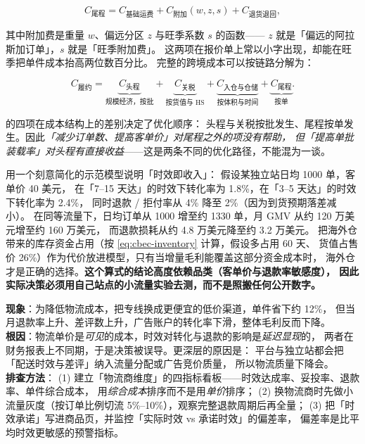 \begin{equation}
C_{\text{尾程}} = C_{\text{基础运费}} + C_{\text{附加}}(w, z, s) + C_{\text{退货退回}} ,
\label{eq:cbec-leg3}
\end{equation}

其中附加费是重量 $w$、偏远分区 $z$ 与旺季系数 $s$ 的函数——
$z$ 就是「偏远的阿拉斯加订单」，$s$ 就是「旺季附加费」。
这两项在报价单上常以小字出现，却能在旺季把单件成本抬高两位数百分比。
完整的跨境成本可以按链路分解为：

\begin{equation}
C_{\text{履约}} = \underbrace{C_{\text{头程}}}_{\text{规模经济，按批}} + \underbrace{C_{\text{关税}}}_{\text{按货值与 HS}} + \underbrace{C_{\text{入仓与仓储}}}_{\text{按体积与时间}} + \underbrace{C_{\text{尾程}}}_{\text{按单}} .
\label{eq:cbec-costchain}
\end{equation}

 的四项在成本结构上的差别决定了优化顺序：
头程与关税按批发生、尾程按单发生。因此\emph{「减少订单数、提高客单价」对尾程之外的项没有帮助，
但「提高单批装载率」对头程有直接收益}——这是两条不同的优化路径，不能混为一谈。

\begin{casebox}
用一个刻意简化的示范模型说明「时效即收入」：
假设某独立站日均 1000 单，客单价 40 美元，
在「7--15 天达」的时效下转化率为 1.8\%，在「3--5 天达」的时效下转化率为 2.4\%，
同时退款 / 拒付率从 4\% 降至 2\%（因为到货预期落差减小）。
在同等流量下，日均订单从 1000 增至约 1330 单，月 GMV 从约 120 万美元增至约 160 万美元，
而退款损耗从约 4.8 万美元降至约 3.2 万美元。
把海外仓带来的库存资金占用（按 \cref{eq:cbec-inventory} 计算，假设多占用 60 天、
货值占售价 26\%）作为代价放进模型，只有当增量毛利能覆盖这部分资金成本时，
海外仓才是正确的选择。\textbf{这个算式的结论高度依赖品类（客单价与退款率敏感度），
因此实际决策必须用自己站点的小流量实验去测，而不是照搬任何公开数字。}
\end{casebox}

\begin{pitfall}
\textbf{现象}：为降低物流成本，把专线换成更便宜的低价渠道，单件省下约 12\%，
但当月退款率上升、差评数上升，广告账户的转化率下滑，整体毛利反而下降。
\\
\textbf{根因}：物流单价是\emph{可见}的成本，时效对转化与退款的影响是\emph{延迟显现}的，
两者在财务报表上不同期，于是决策被误导。更深层的原因是：
平台与独立站都会把「配送时效与差评」纳入流量分配或广告竞价质量，
所以物流质量下降会。
\\
\textbf{排查方法}：
(1) 建立「物流商维度」的四指标看板——时效达成率、妥投率、退款率、单件综合成本，
用\emph{综合成本}排序而不是用\emph{单价}排序；
(2) 换物流商时先做小流量灰度（按订单比例切流 5\%--10\%），观察完整退款周期后再全量；
(3) 把「时效承诺」写进商品页，并监控「实际时效 vs 承诺时效」的偏差率，
偏差率是比平均时效更敏感的预警指标。
\end{pitfall}

